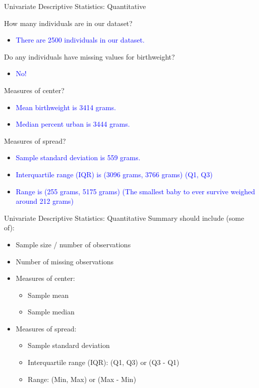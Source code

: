 \documentclass[10pt,t]{beamer}
\begin{document}
\begin{frame}{Univariate Descriptive Statistics: Quantitative}

How many individuals are in our dataset?

\begin{itemize}
	\item[] \textcolor{blue}{There are 2500 individuals in our dataset.}
\end{itemize}

Do any individuals have missing values for birthweight?

\begin{itemize}
	\item[] \textcolor{blue}{No!}
\end{itemize}

Measures of center?

\begin{itemize}
	\item[] \textcolor{blue}{Mean birthweight is 3414 grams.}
	\item[] \textcolor{blue}{Median percent urban is 3444 grams.} 
\end{itemize}

Measures of spread?

\begin{itemize}
	\item[] \textcolor{blue}{Sample standard deviation is 559 grams.}
	\item[] \textcolor{blue}{Interquartile range (IQR) is (3096 grams, 3766 grams) (Q1, Q3)}
	\item[] \textcolor{blue}{Range is (255 grams, 5175 grams) (The smallest baby to ever survive weighed around 212 grams)}
\end{itemize}


\end{frame}
	
\begin{frame}{Univariate Descriptive Statistics: Quantitative}
Summary should include (some of):

\vspace{0.3cm}

\begin{itemize}
	\item Sample size / number of observations
	\item Number of missing observations
	\item Measures of center:
	\begin{itemize}
		\item Sample mean
		\item Sample median
	\end{itemize}
	\item Measures of spread:
	\begin{itemize}
		\item Sample standard deviation
		\item Interquartile range (IQR): (Q1, Q3) or (Q3 - Q1)
		\item Range: (Min, Max) or (Max - Min)
	\end{itemize}
\end{itemize}

\end{frame}
\end{document}
